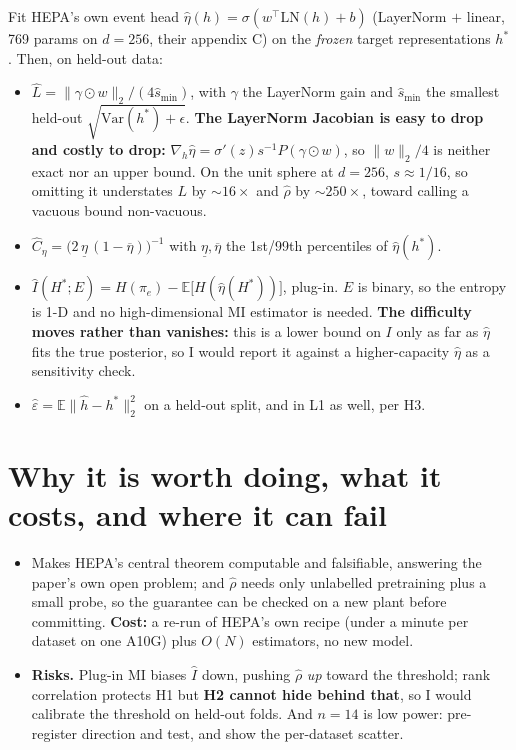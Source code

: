 \documentclass[9pt]{extarticle}
\newcommand{\B}[1]{\textbf{#1}}
\begin{document}
Fit HEPA's own event head $\hat\eta(h)=\sigma(w^\top \mathrm{LN}(h) + b)$ (LayerNorm $+$ linear, 769 params on
$d{=}256$, their appendix C) on the \emph{frozen} target representations $h^*$. Then, on held-out data:
\begin{itemize}
\item $\hat L = \|\gamma \odot w\|_2/(4\hat s_{\min})$, with $\gamma$ the LayerNorm gain and $\hat s_{\min}$
      the smallest held-out $\sqrt{\mathrm{Var}(h^*)+\epsilon}$. \B{The LayerNorm Jacobian is easy to drop and
      costly to drop:} $\nabla_h\hat\eta = \sigma'(z)s^{-1}P(\gamma\odot w)$, so $\|w\|_2/4$ is neither exact nor
      an upper bound. On the unit sphere at $d{=}256$, $s\approx 1/16$, so omitting it understates $L$ by
      ${\sim}16\times$ and $\hat\rho$ by ${\sim}250\times$, toward calling a vacuous bound non-vacuous.
\item $\hat C_\eta = \big(2\,\underline{\eta}\,(1-\overline{\eta})\big)^{-1}$ with $\underline{\eta},\overline{\eta}$
      the 1st/99th percentiles of $\hat\eta(h^*)$.
\item $\hat I(H^*;E) = H(\pi_e) - \mathbb{E}\big[H(\hat\eta(H^*))\big]$, plug-in. $E$ is binary, so the entropy
      is 1-D and no high-dimensional MI estimator is needed. \B{The difficulty moves rather than vanishes:} this
      is a lower bound on $I$ only as far as $\hat\eta$ fits the true posterior, so I would report it against a
      higher-capacity $\hat\eta$ as a sensitivity check.
\item $\hat\varepsilon = \mathbb{E}\|\hat h - h^*\|_2^2$ on a held-out split, and in L1 as well, per H3.
\end{itemize}

\section{Why it is worth doing, what it costs, and where it can fail}

\begin{itemize}
\item Makes HEPA's central theorem computable and falsifiable, answering the paper's own open problem; and
      $\hat\rho$ needs only unlabelled pretraining plus a small probe, so the guarantee can be checked on a new
      plant before committing. \B{Cost:} a re-run of HEPA's own recipe (under a minute per dataset on one A10G)
      plus $O(N)$ estimators, no new model.
\item \B{Risks.} Plug-in MI biases $\hat I$ down, pushing $\hat\rho$ \emph{up} toward the threshold; rank
      correlation protects H1 but \B{H2 cannot hide behind that}, so I would calibrate the threshold on held-out
      folds. And $n{=}14$ is low power: pre-register direction and test, and show the per-dataset scatter.
\end{itemize}
\end{document}
